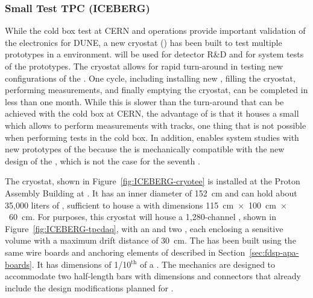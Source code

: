 
\subsubsection{Small Test TPC (ICEBERG)}
\label{sec:fdsp-tpcelec-qa-facilities-testtpc}

While the cold box test at CERN and  operations provide important 
validation of the  electronics for DUNE, a new cryostat () 
has been built to test multiple  prototypes in a  environment.
 will be used for 
 detector R\&D and for system tests of the  prototypes. 
The  cryostat allows for rapid turn-around in testing new configurations
of the . One cycle, including installing new , filling the cryostat,
performing measurements, and finally emptying the cryostat, can be completed in less than
one month. While this is slower than the turn-around that can be achieved with the
cold box at CERN, the advantage of  is that it houses a small  which
allows to perform measurements with tracks, one thing that is not possible when performing
tests in the cold box. In addition,  enables system studies with new
prototypes of the  because the  is mechanically compatible with the 
new design of the , which is not the case for the seventh  .  

The  cryostat, shown in Figure~\ref{fig:ICEBERG-cryotee} is installed
at the Proton Assembly Building at . It has an inner diameter of \SI{152}{cm}
and can hold about 35,000 liters of , sufficient to house a
 with dimensions \SI{115}{cm}~$\times$~\SI{100}{cm}~$\times$~\SI{60}{cm}. For
 purposes, this cryostat will house a 1,280-channel , shown in
Figure~\ref{fig:ICEBERG-tpcdaq}, with an  and two , each 
enclosing a sensitive volume with a maximum drift distance of \SI{30}{cm}. The  
has been built using the same wire boards and anchoring elements of  
described in Section~\ref{sec:fdsp-apa-boards}. It has dimensions of 
1/10$^{\mathrm{th}}$ of a  . The  mechanics are designed to
accommodate two half-length  bars with dimensions and connectors that already 
include the design modifications planned for .


